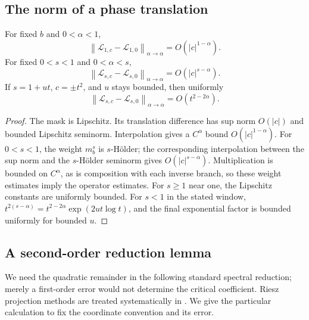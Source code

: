 \documentclass[11pt,a4paper]{article}
\numberwithin{equation}{section}
\theoremstyle{definition}
\theoremstyle{remark}
\newcommand{\Lop}{\mathcal L}
\newcommand{\norm}[1]{\left\lVert#1\right\rVert}
\begin{document}
\subsection{The norm of a phase translation}
\begin{lemma}
\label{lem:translation-norm}
For fixed $b$ and $0<\alpha<1$,
\begin{equation}
 \norm{\Lop_{1,c}-\Lop_{1,0}}_{\alpha\to\alpha}
 =O(|c|^{1-\alpha}).
 \label{eq:critical-norm}
\end{equation}
For fixed $0<s<1$ and $0<\alpha<s$,
\begin{equation}
 \norm{\Lop_{s,c}-\Lop_{s,0}}_{\alpha\to\alpha}
 =O(|c|^{s-\alpha}).
 \label{eq:subcritical-norm}
\end{equation}
If $s=1+ut$, $c=\pm t^2$, and $u$ stays bounded, then uniformly
\begin{equation}
 \norm{\Lop_{s,c}-\Lop_{s,0}}_{\alpha\to\alpha}
 =O(t^{2-2\alpha}).
 \label{eq:window-norm}
\end{equation}
\end{lemma}
\begin{proof}
The mask is Lipschitz. Its translation difference has sup norm $O(|c|)$
and bounded Lipschitz seminorm. Interpolation gives a $C^\alpha$ bound
$O(|c|^{1-\alpha})$. For $0<s<1$, the weight $m_b^s$ is $s$-H\"older;
the corresponding interpolation between the sup norm and the
$s$-H\"older seminorm gives $O(|c|^{s-\alpha})$.
Multiplication is bounded on $C^\alpha$, as is composition with each
inverse branch, so these weight estimates imply the operator estimates.
For $s\ge1$ near one, the Lipschitz constants are uniformly bounded.
For $s<1$ in the stated window,
$t^{2(s-\alpha)}=t^{2-2\alpha}\exp(2ut\log t)$, and the final
exponential factor is bounded uniformly for bounded $u$.
\end{proof}

\subsection{A second-order reduction lemma}
We need the quadratic remainder in the following standard spectral
reduction; merely a first-order error would not determine the critical
coefficient. Riesz projection methods are treated systematically in
\cite{Kato}. We give the particular calculation to fix the coordinate
convention and its error.
\end{document}
